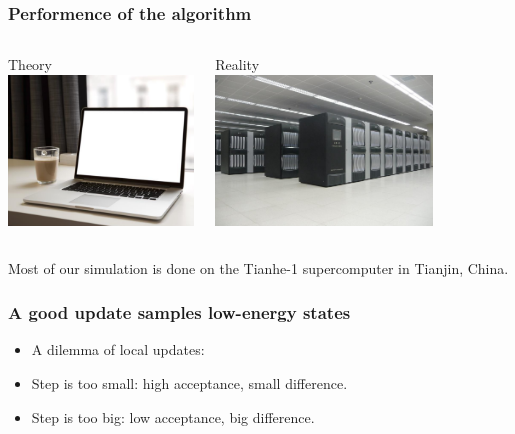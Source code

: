 \documentclass[xcolor=table, 10pt, aspectratio=169, ignorenonframetext]{beamer}
\begin{document}
\begin{frame}
  \frametitle{Performence of the algorithm}
    \begin{columns}
      \begin{center}
				Theory\\
				\vspace{.5cm}
        \includegraphics[height=4cm]{../slmctut/laptop_coffee}
      \end{center}
      \begin{center}
				Reality\\
				\vspace{.5cm}
        \includegraphics[height=4cm]{../slmctut/tianhe}
      \end{center}
    \end{columns}
\vspace{.5cm}
Most of our simulation is done on the Tianhe-1 supercomputer in Tianjin, China.
\end{frame}

\begin{frame}
  \frametitle{A good update samples low-energy states}
  \begin{center}
  \end{center}
  \begin{itemize}
    \item A dilemma of local updates:
    \item<1-> Step is too small: high acceptance, small difference.
    \item<2-> Step is too big: low acceptance, big difference.
  \end{itemize}
\end{frame}
\end{document}
